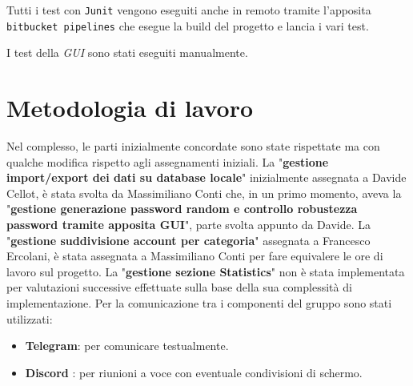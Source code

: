 \documentclass[a4paper,12pt]{report}
\begin{document}
Tutti i test con \texttt{Junit} vengono eseguiti anche in remoto tramite 
l'apposita \texttt{bitbucket pipelines} che esegue la build del progetto e lancia i vari test.

I test della \textit{GUI} sono stati eseguiti manualmente.

\section{Metodologia di lavoro}

Nel complesso, le parti inizialmente concordate sono state rispettate ma con qualche modifica rispetto agli assegnamenti iniziali. 
La "\textbf{gestione import/export dei dati su database locale}" inizialmente assegnata a Davide Cellot, 
è stata svolta da Massimiliano Conti che, in un primo momento, aveva la "\textbf{gestione generazione password random e 
controllo robustezza password tramite apposita GUI}", parte svolta appunto da Davide. La "\textbf{gestione suddivisione 
account per categoria}" assegnata a Francesco Ercolani, è stata assegnata a Massimiliano Conti per fare equivalere le ore di lavoro sul progetto.
La "\textbf{gestione sezione Statistics}" non è stata implementata per valutazioni successive effettuate sulla base della sua complessità di implementazione. 
Per la comunicazione tra i componenti del gruppo sono stati utilizzati:
\begin{itemize}
  \item \textbf{Telegram}: per comunicare testualmente.
  \item \textbf{Discord} : per riunioni a voce con eventuale condivisioni di schermo.
\end{itemize}
\end{document}
